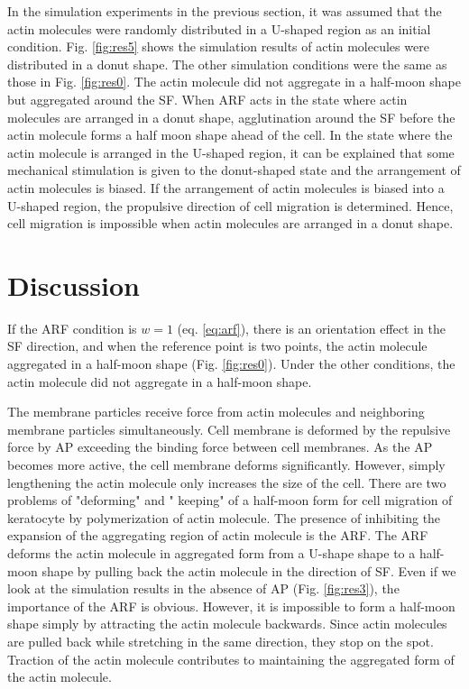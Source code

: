 \documentclass[a4paper,12pt, oneside]{book}
\begin{document}
In the simulation experiments in the previous section, it was assumed that the actin molecules were randomly distributed in a U-shaped region as an initial condition.
Fig. \ref{fig:res5} shows the simulation results of actin molecules were distributed in a donut shape.
The other simulation conditions were the same as those in Fig. \ref{fig:res0}.
The actin molecule did not aggregate in a half-moon shape but aggregated around the SF.
When ARF acts in the state where actin molecules are arranged in a donut shape, agglutination around the SF before the actin molecule forms a half moon shape ahead of the cell.
In the state where the actin molecule is arranged in the U-shaped region, it can be explained that some mechanical stimulation is given to the donut-shaped state and the arrangement of actin molecules is biased.
If the arrangement of actin molecules is biased into a U-shaped region, the propulsive direction of cell migration is determined.
Hence, cell migration is impossible when actin molecules are arranged in a donut shape.

\section{Discussion}
If the ARF condition is $w=1$ (eq. \ref{eq:arf}), there is an orientation effect in the SF direction, and when the reference point is two points, the actin molecule aggregated in a half-moon shape (Fig. \ref{fig:res0}).
Under the other conditions, the actin molecule did not aggregate in a half-moon shape.

The membrane particles receive force from actin molecules and neighboring membrane particles simultaneously.
Cell membrane is deformed by the repulsive force by AP exceeding the binding force between cell membranes.
As the AP becomes more active, the cell membrane deforms significantly.
However, simply lengthening the actin molecule only increases the size of the cell.
There are two problems of "deforming" and " keeping" of a half-moon form for cell migration of keratocyte by polymerization of actin molecule.
The presence of inhibiting the expansion of the aggregating region of actin molecule is the ARF.
The ARF deforms the actin molecule in aggregated form from a U-shape shape to a half-moon shape by pulling back the actin molecule in the direction of SF.
Even if we look at the simulation results in the absence of AP (Fig. \ref{fig:res3}), the importance of the ARF is obvious.
However, it is impossible to form a half-moon shape simply by attracting the actin molecule backwards.
Since actin molecules are pulled back while stretching in the same direction, they stop on the spot.
Traction of the actin molecule contributes to maintaining the aggregated form of the actin molecule.
\end{document}
